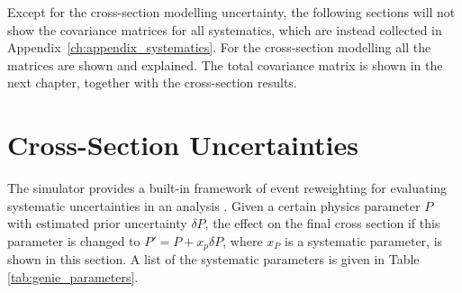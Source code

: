 Except for the cross-section modelling uncertainty, the following sections will not show the covariance matrices for all systematics, which are instead collected in Appendix~\ref{ch:appendix_systematics}. For the cross-section modelling all the matrices are shown and explained. The total covariance matrix is shown in the next chapter, together with the cross-section results.









\section{Cross-Section Uncertainties}
\label{sec:error_xsec}

The \g simulator provides a built-in framework of event reweighting for evaluating systematic uncertainties in an analysis \cite{GENIE, GENIE_reweighting}. Given a certain physics parameter $P$ with estimated prior uncertainty $\delta P$, the effect on the final cross section if this parameter is changed to $P'=P+x_p\delta P$, where $x_P$ is a systematic parameter, is shown in this section. 
A list of the systematic parameters is given in Table \ref{tab:genie_parameters}.

